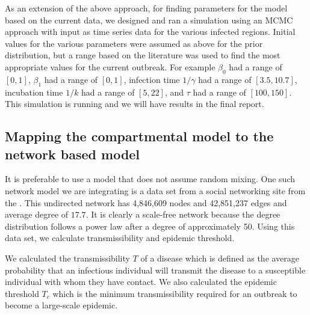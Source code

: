 \documentclass[10pt, journal,onecolumn]{IEEEtran}
\begin{document}
As an extension of the above approach, for finding parameters for the model based on the current data,
we designed and ran a simulation using an MCMC approach with input as time series data for the
various infected regions. Initial values for the various parameters were assumed as above for the
prior distribution, but a range based on the literature was used to find the most appropriate
values for the current outbreak. For example $\beta_0$  had a range of $[0,1]$,  $\beta_1$ had a range of
$[0,1]$, infection time $1/\gamma$ had a range of $[3.5,10.7]$, incubation time $1/k$ had a range of $[5,22]$,
and $\tau$ had a range of $[100,150]$. This simulation is running and we will
have results in the final report.




\subsection*{\textbf{Mapping the compartmental model to the network based model}}

\begin{figure}[ht]
\centering
{}
\end{figure}

It is preferable to use a model that does not assume random mixing.
One such network model we are integrating is a data set from a social networking site from
the \cite{topcoderdata}.
This undirected network has 4,846,609 nodes and 42,851,237 edges and average degree of $17.7$.
It is clearly a scale-free network because the degree distribution follows a power law after a degree of
approximately 50.
Using this data set, we calculate transmissibility and epidemic threshold.

We calculated the transmissibility $T$ of a disease which is defined as the average probability that an infectious
individual will transmit the disease to a susceptible individual with whom they have contact. We also calculated
the epidemic threshold $T_c$ which is the minimum transmissibility required for an outbreak to become
a large-scale epidemic.
\end{document}
